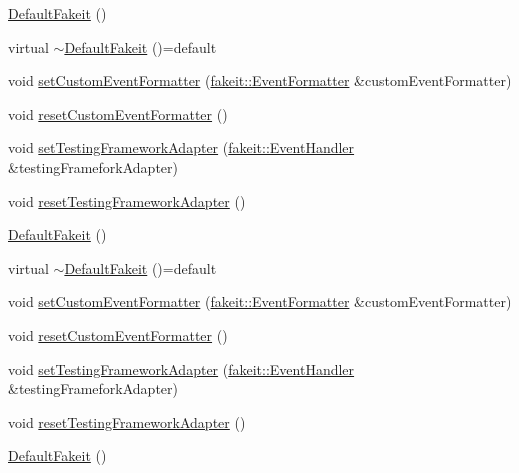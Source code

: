 \begin{DoxyCompactItemize}
\item 
\mbox{\hyperlink{classfakeit_1_1DefaultFakeit_a80d5ef87779c5d3b4e9518ba39e5999f}{Default\+Fakeit}} ()
\item 
virtual \mbox{\hyperlink{classfakeit_1_1DefaultFakeit_a67a996782eb6675b0c0ee0d3b3c9728c}{$\sim$\+Default\+Fakeit}} ()=default
\item 
void \mbox{\hyperlink{classfakeit_1_1DefaultFakeit_acd1e573c131e25862030cec8cf223035}{set\+Custom\+Event\+Formatter}} (\mbox{\hyperlink{structfakeit_1_1EventFormatter}{fakeit\+::\+Event\+Formatter}} \&custom\+Event\+Formatter)
\item 
void \mbox{\hyperlink{classfakeit_1_1DefaultFakeit_a1fe3c5a8670686b732765e6ea1e15b3b}{reset\+Custom\+Event\+Formatter}} ()
\item 
void \mbox{\hyperlink{classfakeit_1_1DefaultFakeit_a7e5375cb58acb0e27a374a32ecf37b5a}{set\+Testing\+Framework\+Adapter}} (\mbox{\hyperlink{structfakeit_1_1EventHandler}{fakeit\+::\+Event\+Handler}} \&testing\+Framefork\+Adapter)
\item 
void \mbox{\hyperlink{classfakeit_1_1DefaultFakeit_a89cf2f8dc0fbfb9e5b18d82eef8fd0c8}{reset\+Testing\+Framework\+Adapter}} ()
\item 
\mbox{\hyperlink{classfakeit_1_1DefaultFakeit_a80d5ef87779c5d3b4e9518ba39e5999f}{Default\+Fakeit}} ()
\item 
virtual \mbox{\hyperlink{classfakeit_1_1DefaultFakeit_a67a996782eb6675b0c0ee0d3b3c9728c}{$\sim$\+Default\+Fakeit}} ()=default
\item 
void \mbox{\hyperlink{classfakeit_1_1DefaultFakeit_acd1e573c131e25862030cec8cf223035}{set\+Custom\+Event\+Formatter}} (\mbox{\hyperlink{structfakeit_1_1EventFormatter}{fakeit\+::\+Event\+Formatter}} \&custom\+Event\+Formatter)
\item 
void \mbox{\hyperlink{classfakeit_1_1DefaultFakeit_a1fe3c5a8670686b732765e6ea1e15b3b}{reset\+Custom\+Event\+Formatter}} ()
\item 
void \mbox{\hyperlink{classfakeit_1_1DefaultFakeit_a7e5375cb58acb0e27a374a32ecf37b5a}{set\+Testing\+Framework\+Adapter}} (\mbox{\hyperlink{structfakeit_1_1EventHandler}{fakeit\+::\+Event\+Handler}} \&testing\+Framefork\+Adapter)
\item 
void \mbox{\hyperlink{classfakeit_1_1DefaultFakeit_a89cf2f8dc0fbfb9e5b18d82eef8fd0c8}{reset\+Testing\+Framework\+Adapter}} ()
\item 
\mbox{\hyperlink{classfakeit_1_1DefaultFakeit_a80d5ef87779c5d3b4e9518ba39e5999f}{Default\+Fakeit}} ()
\item 

\end{DoxyCompactItemize}
